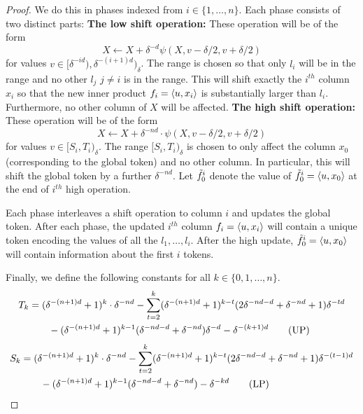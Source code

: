 \begin{proof}
We do this in phases indexed from $i  \in \{1,\dots, n\}$.  Each phase consists of two distinct parts:
    \newline
    \textbf{ The low shift operation:} These operation will be  of the form
        \[ X \leftarrow X +  \delta^{-d}\psi \left(X,v -\delta/2, v + \delta/2 \right) \]  for values
        $v \in [\delta^{-id}), \delta^{-(i+1)d})_{\delta}$. 
        The range is chosen so that only $l_i$ will be in the range and no other $l_j$ $j\neq i$
        is in the range. 
        This will shift exactly the $i^{th}$ column $x_i$ so that the new inner product
        $f_i = \left \langle u, x_i \right \rangle $  is substantially larger than $l_i$. Furthermore, no
        other column of $X$ will be affected. 
    \newline
    \textbf{ The high shift operation: }
    These operation will be  of the form
        \[ X \leftarrow X +  \delta^{-nd} \cdot \psi \left(X,v -\delta/2, v + \delta/2 \right)\] 
        for values $v \in [S_i, T_i)_{\delta}$. The range $[S_{i}, T_i)_{\delta}$ is chosen to 
        only affect the column $x_0$ (corresponding to the global token) and no other column. In particular, this 
        will shift the global token by a further $\delta^{-nd}$. Let $\tilde{f}_0^i$ denote the value of 
        $\tilde{f}^i_0 = \left \langle u, x_0 \right \rangle$ at the end of $i^{th}$ high operation. 
    
    Each phase interleaves a shift operation to column $i$ and updates the global token. 
    After each phase, the updated $i^{th}$ column $f_i = \left \langle u, x_i \right \rangle $ will contain a unique token
    encoding the values of all the $l_1,\dots,l_i$. After the high update, $\tilde{f}_{0}^i = \left \langle u, x_0 \right \rangle$
    will contain information about the first $i$ tokens. 
    
    Finally, we define the following constants for all $k \in \{0,1,\dots,n\}$. 
     \begin{align}
    T_k &= (\delta^{-(n+1)d} + 1)^{k} \cdot \delta^{-nd} -  \sum_{t=2}^k  (\delta^{-(n+1)d} + 1)^{k-t}( 2\delta^{-nd-d}  +  \delta^{-nd} +1) \delta^{-td} \notag \\
         & \qquad -   (\delta^{-(n+1)d} + 1)^{k-1}(\delta^{-nd-d}  +  \delta^{-nd} )\delta^{-d}  - \delta^{-(k+1)d} \label{eqn:upper-bound} \tag{UP}
    \end{align}
    \begin{align}
    S_k &= (\delta^{-(n+1)d} + 1)^{k} \cdot \delta^{-nd} -  \sum_{t=2}^k  (\delta^{-(n+1)d} + 1)^{k-t}( 2\delta^{-nd-d}  +  \delta^{-nd} +1) \delta^{-(t-1)d} \notag \\
         & \qquad -   (\delta^{-(n+1)d} + 1)^{k-1}(\delta^{-nd-d}  +  \delta^{-nd} ) - \delta^{-kd} \label{eqn:lower-bound} \tag{LP}
    \end{align}
    

\end{proof}
